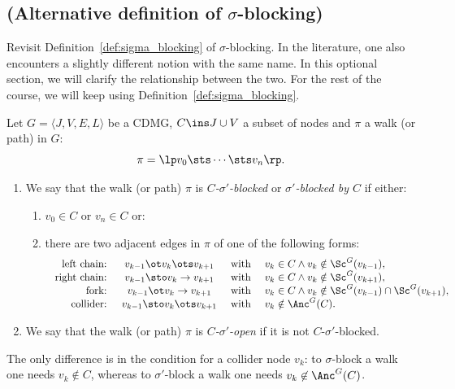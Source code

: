 \subsection{(Alternative definition of $\sigma$-blocking)}

Revisit Definition~\ref{def:sigma_blocking} of $\sigma$-blocking. In the literature, one also encounters
a slightly different notion with the same name. In this optional section, we will clarify the relationship
between the two. For the rest of the course, we will keep using Definition~\ref{def:sigma_blocking}.
\begin{Def}\label{def:sigma_blocking_2}
  Let $G=\langle J,V,E,L \rangle$ be a CDMG, $C \ins J \cup V$ a subset of nodes and $\pi$ a walk (or path) in $G$:
  \[ \pi =\lp  v_0 \sts \cdots \sts v_n \rp.  \]
\begin{enumerate}
  \item
    We say that the walk (or path) $\pi$ is \emph{$C$-$\sigma'$-blocked} or \emph{$\sigma'$-blocked by $C$} if either:
      \begin{enumerate}[label=\roman*.)]
          \item $v_0 \in C$ or $v_n \in C$ or:
          \item there are two adjacent edges in $\pi$ of one of the following forms:
              \[\begin{array}{rccl}
  \text{ left chain: } & v_{k-1} \ot v_k \ots v_{k+1} & \text{ with } & v_k \in C \land v_k \notin \Sc^G(v_{k-1}),\\
  \text{ right chain: } & v_{k-1} \sto v_k \to v_{k+1} & \text{ with } & v_k \in C \land v_k \notin \Sc^G(v_{k+1}),\\
  \text{ fork: } & v_{k-1} \ot v_k \to v_{k+1} & \text{ with } & v_k \in C \land v_k \notin \Sc^G(v_{k-1}) \cap \Sc^G(v_{k+1}),\\
                \text{ collider: } & v_{k-1} \sto v_k \ots v_{k+1} & \text{ with } & v_k \notin \Anc^G(C).
              \end{array}\]
      \end{enumerate}
  \item We say that the walk (or path) $\pi$ is \emph{$C$-$\sigma'$-open} if it is not $C$-$\sigma'$-blocked. 
\end{enumerate}
\end{Def}
The only difference is in the condition for a collider node $v_k$: to $\sigma$-block
a walk one needs $v_k \not\in C$, whereas to $\sigma'$-block a walk one needs $v_k \not\in \Anc^G(C)$.

